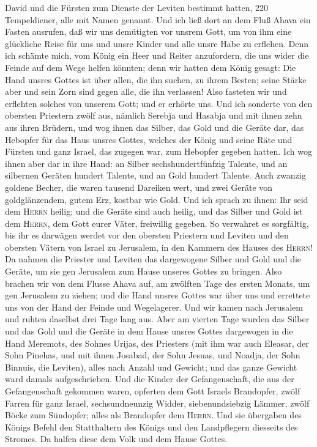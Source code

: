 David und die Fürsten zum Dienste der Leviten bestimmt hatten, 220
Tempeldiener, alle mit Namen genannt.  Und ich ließ dort
an dem Fluß Ahava ein Fasten ausrufen, daß wir uns demütigten vor unsrem
Gott, um von ihm eine glückliche Reise für uns und unsre Kinder und alle
unsre Habe zu erflehen.  Denn ich schämte mich, vom König
ein Heer und Reiter anzufordern, die uns wider die Feinde auf dem Wege
helfen könnten; denn wir hatten dem König gesagt: Die Hand unsres Gottes
ist über allen, die ihn suchen, zu ihrem Besten; seine Stärke aber und
sein Zorn sind gegen alle, die ihn verlassen!  Also
fasteten wir und erflehten solches von unserem Gott; und er erhörte uns.
 Und ich sonderte von den obersten Priestern zwölf aus,
nämlich Serebja und Hasabja und mit ihnen zehn aus ihren Brüdern,
 und wog ihnen das Silber, das Gold und die Geräte dar,
das Hebopfer für das Haus unsres Gottes, welches der König und seine
Räte und Fürsten und ganz Israel, das zugegen war, zum Hebopfer gegeben
hatten.  Ich wog ihnen aber dar in ihre Hand: an Silber
sechshundertfünfzig Talente, und an silbernen Geräten hundert Talente,
und an Gold hundert Talente.  Auch zwanzig goldene
Becher, die waren tausend Dareiken wert, und zwei Geräte von
goldglänzendem, gutem Erz, kostbar wie Gold.  Und ich
sprach zu ihnen: Ihr seid dem \textsc{Herrn} heilig; und die Geräte sind
auch heilig, und das Silber und Gold ist dem \textsc{Herrn}, dem Gott
eurer Väter, freiwillig gegeben.  So verwahret es
sorgfältig, bis ihr es darwägen werdet vor den obersten Priestern und
Leviten und den obersten Vätern von Israel zu Jerusalem, in den Kammern
des Hauses des \textsc{Herrn}!  Da nahmen die Priester
und Leviten das dargewogene Silber und Gold und die Geräte, um sie gen
Jerusalem zum Hause unseres Gottes zu bringen.  Also
brachen wir von dem Flusse Ahava auf, am zwölften Tage des ersten
Monats, um gen Jerusalem zu ziehen; und die Hand unsres Gottes war über
uns und errettete uns von der Hand der Feinde und Wegelagerer.
 Und wir kamen nach Jerusalem und ruhten daselbst drei
Tage lang aus.  Aber am vierten Tage wurden das Silber
und das Gold und die Geräte in dem Hause unsres Gottes dargewogen in die
Hand Meremots, des Sohnes Urijas, des Priesters (mit ihm war auch
Eleasar, der Sohn Pinehas, und mit ihnen Josabad, der Sohn Jesuas, und
Noadja, der Sohn Binnuis, die Leviten),  alles nach
Anzahl und Gewicht; und das ganze Gewicht ward damals aufgeschrieben.
 Und die Kinder der Gefangenschaft, die aus der
Gefangenschaft gekommen waren, opferten dem Gott Israels Brandopfer,
zwölf Farren für ganz Israel, sechsundneunzig Widder, siebenundsiebzig
Lämmer, zwölf Böcke zum Sündopfer; alles als Brandopfer dem
\textsc{Herrn}.  Und sie übergaben des Königs Befehl den
Statthaltern des Königs und den Landpflegern diesseits des Stromes. Da
halfen diese dem Volk und dem Hause Gottes.

